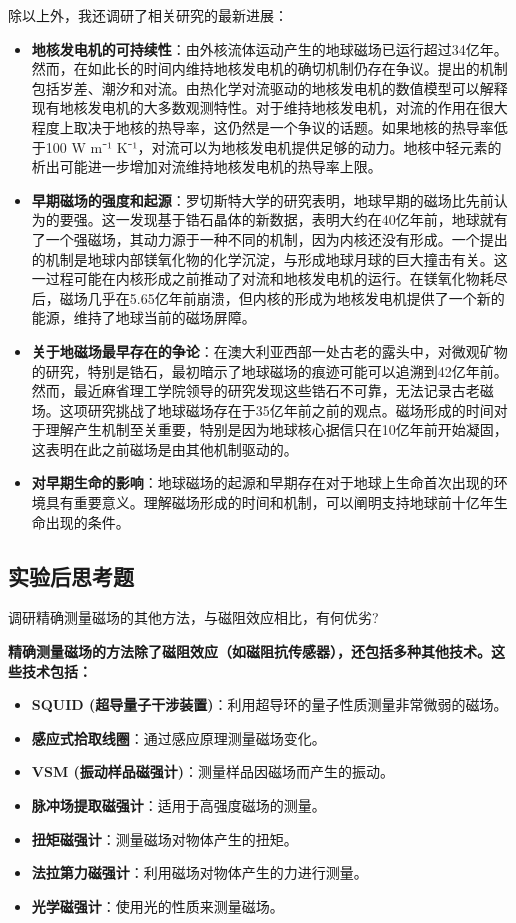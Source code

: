 \documentclass[dvipsnames, svgnames,a4paper,11pt]{article}
\begin{document}
	除以上外，我还调研了相关研究的最新进展：
	\begin{itemize}
		\item \textbf{地核发电机的可持续性}：由外核流体运动产生的地球磁场已运行超过34亿年。然而，在如此长的时间内维持地核发电机的确切机制仍存在争议。提出的机制包括岁差、潮汐和对流。由热化学对流驱动的地核发电机的数值模型可以解释现有地核发电机的大多数观测特性。对于维持地核发电机，对流的作用在很大程度上取决于地核的热导率，这仍然是一个争议的话题。如果地核的热导率低于100 W m⁻¹ K⁻¹，对流可以为地核发电机提供足够的动力。地核中轻元素的析出可能进一步增加对流维持地核发电机的热导率上限。
		
		\item \textbf{早期磁场的强度和起源}：罗切斯特大学的研究表明，地球早期的磁场比先前认为的要强。这一发现基于锆石晶体的新数据，表明大约在40亿年前，地球就有了一个强磁场，其动力源于一种不同的机制，因为内核还没有形成。一个提出的机制是地球内部镁氧化物的化学沉淀，与形成地球月球的巨大撞击有关。这一过程可能在内核形成之前推动了对流和地核发电机的运行。在镁氧化物耗尽后，磁场几乎在5.65亿年前崩溃，但内核的形成为地核发电机提供了一个新的能源，维持了地球当前的磁场屏障。
		
		\item \textbf{关于地磁场最早存在的争论}：在澳大利亚西部一处古老的露头中，对微观矿物的研究，特别是锆石，最初暗示了地球磁场的痕迹可能可以追溯到42亿年前。然而，最近麻省理工学院领导的研究发现这些锆石不可靠，无法记录古老磁场。这项研究挑战了地球磁场存在于35亿年前之前的观点。磁场形成的时间对于理解产生机制至关重要，特别是因为地球核心据信只在10亿年前开始凝固，这表明在此之前磁场是由其他机制驱动的。
		
		\item \textbf{对早期生命的影响}：地球磁场的起源和早期存在对于地球上生命首次出现的环境具有重要意义。理解磁场形成的时间和机制，可以阐明支持地球前十亿年生命出现的条件。
	\end{itemize}
	
	
	\clearpage
	\subsection{实验后思考题}
	\begin{question}
		调研精确测量磁场的其他方法，与磁阻效应相比，有何优劣? 
	\end{question}
	\textbf{精确测量磁场的方法除了磁阻效应（如磁阻抗传感器），还包括多种其他技术。这些技术包括：}
	\begin{itemize}
		\item \textbf{SQUID (超导量子干涉装置)}：利用超导环的量子性质测量非常微弱的磁场。
		\item \textbf{感应式拾取线圈}：通过感应原理测量磁场变化。
		\item \textbf{VSM (振动样品磁强计)}：测量样品因磁场而产生的振动。
		\item \textbf{脉冲场提取磁强计}：适用于高强度磁场的测量。
		\item \textbf{扭矩磁强计}：测量磁场对物体产生的扭矩。
		\item \textbf{法拉第力磁强计}：利用磁场对物体产生的力进行测量。
		\item \textbf{光学磁强计}：使用光的性质来测量磁场。
	\end{itemize}
	
\end{document}
